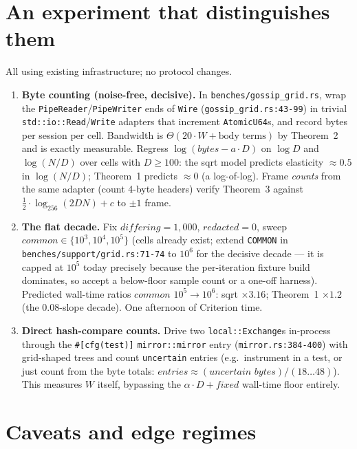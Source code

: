\documentclass[11pt]{article}
\newcommand{\code}[1]{\texttt{#1}}
\theoremstyle{plain}
\begin{document}
\section{An experiment that distinguishes them}

All using existing infrastructure; no protocol changes.

\begin{enumerate}
\item \textbf{Byte counting (noise-free, decisive).} In
  \code{benches/gossip\_grid.rs}, wrap the
  \code{PipeReader}/\code{PipeWriter} ends of \code{Wire}
  (\code{gossip\_grid.rs:43-99}) in trivial
  \code{std::io::Read}/\code{Write} adapters that increment
  \code{AtomicU64}s, and record bytes per session per cell. Bandwidth is
  $\Theta(20 \cdot W + \text{body terms})$ by Theorem~2 and is exactly
  measurable. Regress $\log(\textit{bytes} - a \cdot D)$ on $\log D$ and
  $\log(N/D)$ over cells with $D \ge 100$: the sqrt model predicts
  elasticity $\approx 0.5$ in $\log(N/D)$; Theorem~1 predicts $\approx 0$
  (a log-of-log). Frame \emph{counts} from the same adapter (count 4-byte
  headers) verify Theorem~3 against
  $\tfrac{1}{2} \cdot \log_{256}(2DN) + c$ to $\pm 1$ frame.
\item \textbf{The flat decade.} Fix $\textit{differing} = 1{,}000$,
  $\textit{redacted} = 0$, sweep
  $\textit{common} \in \{10^3, 10^4, 10^5\}$ (cells already exist; extend
  \code{COMMON} in \code{benches/support/grid.rs:71-74} to $10^6$ for the
  decisive decade --- it is capped at $10^5$ today precisely because the
  per-iteration fixture build dominates, so accept a below-floor sample
  count or a one-off harness). Predicted wall-time
  ratios $\textit{common } 10^5 \to 10^6$: sqrt $\times 3.16$; Theorem~1
  $\times 1.2$ (the $0.08$-slope decade). One afternoon of Criterion time.
\item \textbf{Direct hash-compare counts.} Drive two
  \code{local::Exchange}s in-process through the \code{\#[cfg(test)]}
  \code{mirror::mirror} entry (\code{mirror.rs:384-400}) with grid-shaped
  trees and count \code{uncertain} entries (e.g.\ instrument in a test, or
  just count from the byte totals:
  $\textit{entries} \approx (\textit{uncertain bytes})/(18 \dots 48)$).
  This measures $W$ itself, bypassing the $\alpha \cdot D + \textit{fixed}$
  wall-time floor entirely.
\end{enumerate}

\section{Caveats and edge regimes}
\end{document}
